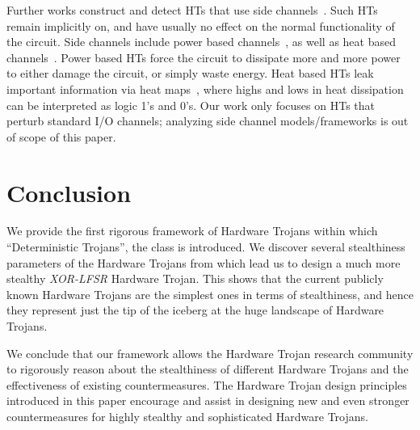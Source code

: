\documentclass[10pt,journal,compsoc]{IEEEtran}
\begin{document}
Further works construct and detect HTs that use side channels~\cite{sidechannel1, sidechannel2, sidechannel3}.
Such HTs remain implicitly on, and have usually no effect on the normal functionality of the circuit.
Side channels include power based channels~\cite{power2}, as well as heat based channels~\cite{power4}.
Power based HTs force the circuit to dissipate more and more power to either damage the circuit, or simply waste energy.
Heat based HTs leak important information via heat maps~\cite{heat}, where highs and lows in heat dissipation can be interpreted as logic 1's and 0's.
Our work only focuses on HTs that perturb standard I/O channels; analyzing side channel models/frameworks is out of scope of this paper.
 \section{Conclusion}\label{sec:conclusion}
We provide the first rigorous framework of Hardware Trojans within which ``Deterministic Trojans'', the class  is introduced.
We discover several stealthiness parameters of the Hardware Trojans from  which lead us to design a much more stealthy \textit{XOR-LFSR} Hardware Trojan.
This shows that the current publicly known Hardware Trojans are the simplest ones in terms of stealthiness, and hence they represent just the tip of the iceberg at the huge landscape of Hardware Trojans.

We conclude that our framework allows the Hardware Trojan research community to rigorously reason about the stealthiness of different Hardware Trojans and the effectiveness of existing countermeasures.
The Hardware Trojan design principles introduced in this paper encourage and assist in designing new and even stronger countermeasures for highly stealthy and sophisticated Hardware Trojans. 


\ifCLASSOPTIONcaptionsoff
  \newpage
\fi


 
\end{document}
